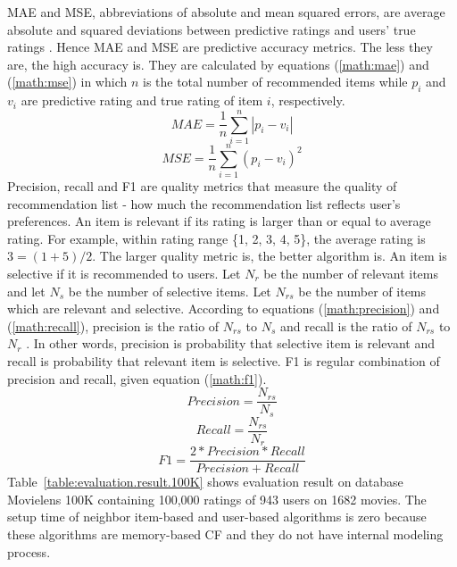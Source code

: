 \documentclass[10pt]{article}
\begin{document}
MAE and MSE, abbreviations of absolute and mean squared errors, are average absolute and squared deviations between predictive ratings and users' true ratings \cite[pp.~20-21]{herlocker:evaluation}. Hence MAE and MSE are predictive accuracy metrics. The less they are, the high accuracy is. They are calculated by equations (\ref{math:mae}) and (\ref{math:mse}) in which $n$ is the total number of recommended items while $p_i$ and $v_i$ are predictive rating and true rating of item $i$, respectively.
\begin{equation}
MAE = \frac{1}{n}\sum_{i=1}^{n}|p_i-v_i|
\label{math:mae}
\end{equation}
\begin{equation}
MSE = \frac{1}{n}\sum_{i=1}^{n}(p_i-v_i)^2
\label{math:mse}
\end{equation}
Precision, recall and F1 are quality metrics that measure the quality of recommendation list - how much the recommendation list reflects user's preferences. An item is relevant if its rating is larger than or equal to average rating. For example, within rating range \{1, 2, 3, 4, 5\}, the average rating is $3 = (1 + 5)/2$. The larger quality metric is, the better algorithm is. An item is selective if it is recommended to users. Let $N_r$ be the number of relevant items and let $N_s$ be the number of selective items. Let $N_{rs}$ be the number of items which are relevant and selective. According to equations (\ref{math:precision}) and (\ref{math:recall}), precision is the ratio of $N_{rs}$ to $N_s$ and recall is the ratio of $N_{rs}$ to $N_r$ \cite[p.~23]{herlocker:evaluation}. In other words, precision is probability that selective item is relevant and recall is probability that relevant item is selective. F1 is regular combination of precision and recall, given equation (\ref{math:f1}).
\begin{equation}
Precision = \frac{N_{rs}}{N_s}
\label{math:precision}
\end{equation}
\begin{equation}
Recall = \frac{N_{rs}}{N_r}
\label{math:recall}
\end{equation}
\begin{equation}
F1 = \frac{2*Precision*Recall}{Precision+Recall}
\label{math:f1}
\end{equation}
Table~\ref{table:evaluation.result.100K} shows evaluation result on database Movielens 100K containing 100,000 ratings of 943 users on 1682 movies. The setup time of neighbor item-based and user-based algorithms is zero because these algorithms are memory-based CF and they do not have internal modeling process.
\end{document}
